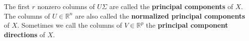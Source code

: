 %
%
%
%
%
%
% 
% 
%
%

The first \(r\) nonzero columns of \(U \Sigma\) are called the \textbf{principal components} of \(X\). The columns of \(U \in \mathbb{R}^n\) are also called the \textbf{normalized principal components} of \(X\). Sometimes we call the columns of \(V \in \mathbb{R}^p\) the \textbf{principal component directions} of \(X\).

